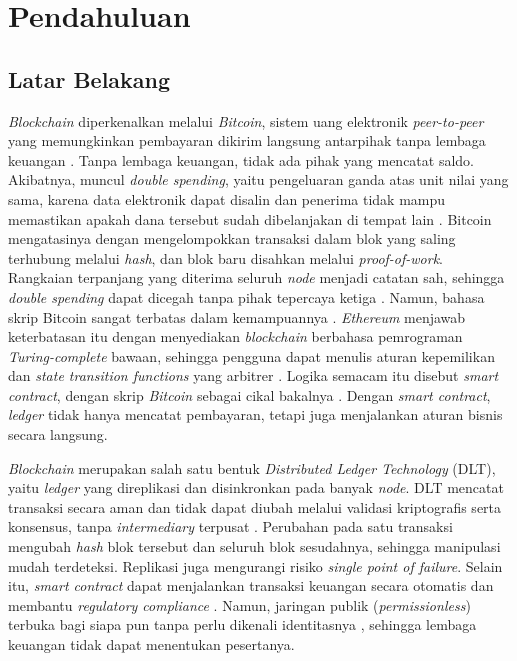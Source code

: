 \chapter{Pendahuluan}

\section{Latar Belakang}

\textit{Blockchain} diperkenalkan melalui \textit{Bitcoin}, sistem uang elektronik \textit{peer-to-peer} yang memungkinkan pembayaran dikirim langsung antarpihak tanpa lembaga keuangan \cite{nakamoto2008}. Tanpa lembaga keuangan, tidak ada pihak yang mencatat saldo. Akibatnya, muncul \textit{double spending}, yaitu pengeluaran ganda atas unit nilai yang sama, karena data elektronik dapat disalin dan penerima tidak mampu memastikan apakah dana tersebut sudah dibelanjakan di tempat lain \cite{nakamoto2008}. Bitcoin mengatasinya dengan mengelompokkan transaksi dalam blok yang saling terhubung melalui \textit{hash}, dan blok baru disahkan melalui \textit{proof-of-work}. Rangkaian terpanjang yang diterima seluruh \textit{node} menjadi catatan sah, sehingga \textit{double spending} dapat dicegah tanpa pihak tepercaya ketiga \cite{nakamoto2008}. Namun, bahasa skrip Bitcoin sangat terbatas dalam kemampuannya \cite{buterin2014}. \textit{Ethereum} menjawab keterbatasan itu dengan menyediakan \textit{blockchain} berbahasa pemrograman \textit{Turing-complete} bawaan, sehingga pengguna dapat menulis aturan kepemilikan dan \textit{state transition functions} yang arbitrer \cite{buterin2014}. Logika semacam itu disebut \textit{smart contract}, dengan skrip \textit{Bitcoin} sebagai cikal bakalnya \cite{androulaki2018}. Dengan \textit{smart contract}, \textit{ledger} tidak hanya mencatat pembayaran, tetapi juga menjalankan aturan bisnis secara langsung.

\textit{Blockchain} merupakan salah satu bentuk \textit{Distributed Ledger Technology} (DLT), yaitu \textit{ledger} yang direplikasi dan disinkronkan pada banyak \textit{node}. DLT mencatat transaksi secara aman dan tidak dapat diubah melalui validasi kriptografis serta konsensus, tanpa \textit{intermediary} terpusat \cite{sethaput2025}. Perubahan pada satu transaksi mengubah \textit{hash} blok tersebut dan seluruh blok sesudahnya, sehingga manipulasi mudah terdeteksi. Replikasi juga mengurangi risiko \textit{single point of failure}. Selain itu, \textit{smart contract} dapat menjalankan transaksi keuangan secara otomatis dan membantu \textit{regulatory compliance} \cite{sethaput2025}. Namun, jaringan publik (\textit{permissionless}) terbuka bagi siapa pun tanpa perlu dikenali identitasnya \cite{androulaki2018}, sehingga lembaga keuangan tidak dapat menentukan pesertanya.


